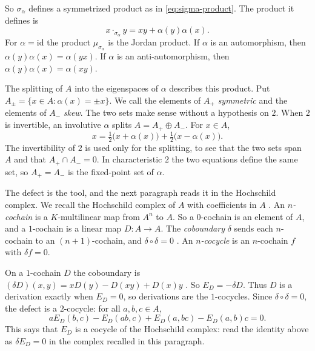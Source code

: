 \documentclass[]{interact}
\theoremstyle{plain}
\theoremstyle{definition}
\theoremstyle{remark}
\begin{document}
So $\sigma_\alpha$ defines a symmetrized product as in \eqref{eq:sigma-product}.
The product it defines is
\begin{equation}\label{eq:twisted-product}
x \cdot_{\sigma_\alpha} y = xy + \alpha(y)\alpha(x).
\end{equation}
For $\alpha = \mathrm{id}$ the product $\mu_{\sigma_\alpha}$ is the Jordan product.
If $\alpha$ is an automorphism, then $\alpha(y)\alpha(x) = \alpha(yx)$.
If $\alpha$ is an anti-automorphism, then $\alpha(y)\alpha(x) = \alpha(xy)$.

The splitting of $A$ into the eigenspaces of $\alpha$ describes this product.
Put $A_\pm = \{x \in A : \alpha(x) = \pm x\}$.
We call the elements of $A_+$ \emph{symmetric} and the elements of $A_-$ \emph{skew}. %
The two sets make sense without a hypothesis on $2$. %
When $2$ is invertible, an involutive $\alpha$ splits $A = A_+ \oplus A_-$.
For $x \in A$,
\[
x = \tfrac12\bigl(x + \alpha(x)\bigr) + \tfrac12\bigl(x - \alpha(x)\bigr).
\]
The invertibility of $2$ is used only for the splitting, to see that the two sets span $A$ and that $A_+ \cap A_- = 0$.
In characteristic $2$ the two equations define the same set, so $A_+ = A_-$ is the fixed-point set of $\alpha$. %

The defect is the tool, and the next paragraph reads it in the Hochschild complex.
We recall the Hochschild complex of $A$ with coefficients in $A$ \citep[\S9.1]{Weibel1994}.
An \emph{$n$-cochain} is a $K$-multilinear map from $A^n$ to $A$.
So a $0$-cochain is an element of $A$, and a $1$-cochain is a linear map $D \colon A \to A$.
The \emph{coboundary} $\delta$ sends each $n$-cochain to an $(n+1)$-cochain, and $\delta \circ \delta = 0$ \citep[\S\S1.1 and 9.1]{Weibel1994}.
An \emph{$n$-cocycle} is an $n$-cochain $f$ with $\delta f = 0$.

On a $1$-cochain $D$ the coboundary is $(\delta D)(x,y) = xD(y) - D(xy) + D(x)y$ \citep[\S2, Definition 2.1]{Hochschild1945}.
So $E_D = -\delta D$.
Thus $D$ is a derivation exactly when $E_D = 0$, so derivations are the $1$-cocycles.
Since $\delta \circ \delta = 0$, the defect is a $2$-cocycle: for all $a, b, c \in A$,
\begin{equation}\label{eq:cocycle}
aE_D(b,c) - E_D(ab,c) + E_D(a,bc) - E_D(a,b)c = 0.
\end{equation}
This says that $E_D$ is a cocycle of the Hochschild complex: read the identity above as $\delta E_D = 0$ in the complex recalled in this paragraph. %
\end{document}
